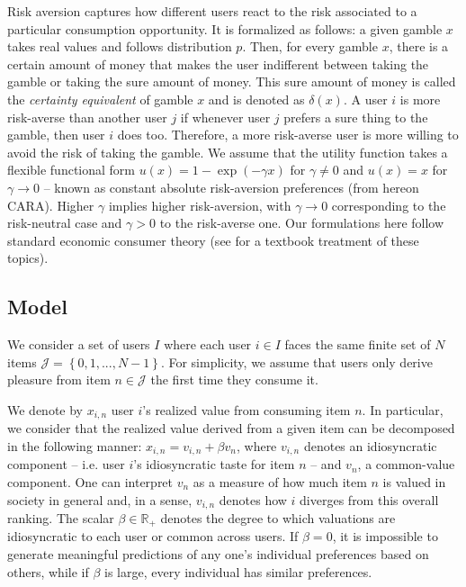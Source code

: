 \documentclass[sigconf]{acmart}
\newcommand{\xhdr}[1]{\vspace{1mm} \noindent{\bf #1}}
\begin{document}
Risk aversion captures how different users react to the risk associated to a particular consumption opportunity. It is formalized as follows: a given gamble $x$ takes real values and follows distribution $p$. Then, for every gamble $x$, there is a certain amount of money that makes the user indifferent between taking the gamble or taking the sure amount of money. This sure amount of money is called the \textit{certainty equivalent} of gamble $x$ and is denoted as $\delta(x)$. A user $i$ is more risk-averse than another user $j$ if whenever user $j$ prefers a sure thing to the gamble, then user $i$ does too. Therefore, a more risk-averse user is more willing to avoid the risk of taking the gamble. We assume that the utility function takes a flexible functional form $u(x)=1-\exp(-\gamma x)$ for $\gamma\ne0$ and $u(x)=x$ for $\gamma\to 0$ -- known as constant absolute risk-aversion preferences (from hereon CARA). Higher $\gamma$ implies higher risk-aversion, with $\gamma \to 0$ corresponding to the risk-neutral case and $\gamma>0$ to the risk-averse one. Our formulations here follow standard economic consumer theory (see \cite{mas1995microeconomic} for a textbook treatment of these topics).



\subsection{Model}


\xhdr{Users.} We consider a set of users $I$ where each user $i \in I$ faces the same finite set of $N$ items $\mathcal J = \left\{0,1,...,N-1\right\}$. For simplicity, we assume that users only derive pleasure from item $n \in \mathcal{J}$ the first time they consume it.



We denote by $x_{i,n}$ user $i$'s realized value from consuming item $n$. In particular, we consider that the realized value derived from a given item can be decomposed in the following manner: $x_{i,n}= v_{i,n} + \beta v_n$, where $v_{i,n}$ denotes an idiosyncratic component -- i.e. user $i$'s idiosyncratic taste for item $n$ --  and $v_{n}$, a common-value component. One can interpret $v_n$ as a measure of how much item $n$ is valued in society in general and, in a sense, $v_{i,n}$ denotes how $i$ diverges from this overall ranking. The scalar $\beta \in \mathbb{R}_{+}$ denotes the degree to which valuations are idiosyncratic to each user or common across users. If $\beta=0$, it is impossible to generate meaningful predictions of any one's individual preferences based on others, while if $\beta$ is large, every individual has similar preferences.
\end{document}
